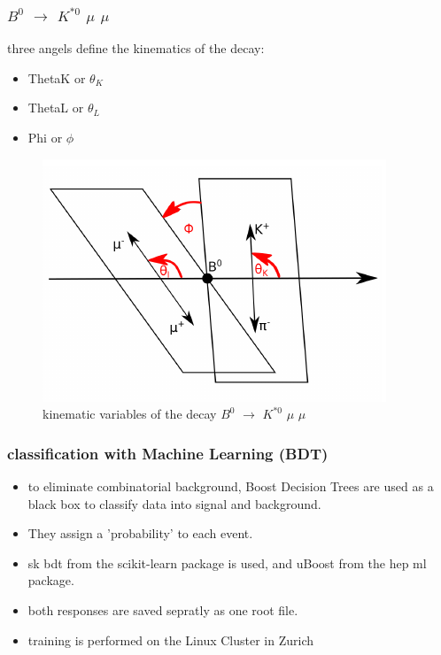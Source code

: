 \documentclass{beamer}
\begin{document}
\begin{frame}
\frametitle{$B^0$ $\rightarrow$ $K^{*0}$ $\mu$ $\mu$}
three angels define the kinematics of the decay:
\begin{itemize}
  \item ThetaK or $\theta_K$
  \item ThetaL or $\theta_L$
  \item Phi or $\phi$
\end{itemize}

\begin{figure}
  \includegraphics[width=0.6\linewidth]{angels}
  \caption{kinematic variables of the decay $B^0$ $\rightarrow$ $K^{*0}$ $\mu$ $\mu$}
\end{figure}

\end{frame}


\begin{frame}
  \frametitle{classification with Machine Learning (BDT)}
  \begin{itemize}
    \item to eliminate combinatorial background, Boost Decision Trees are used as a black box to classify data into signal and background.
    \item They assign a 'probability' to each event.
    \item sk bdt from the scikit-learn package is used, and uBoost from the hep ml package.
    \item both responses are saved sepratly as one root file.
    \item training is performed on the Linux Cluster in Zurich
  \end{itemize}
\end{frame}
\end{document}
